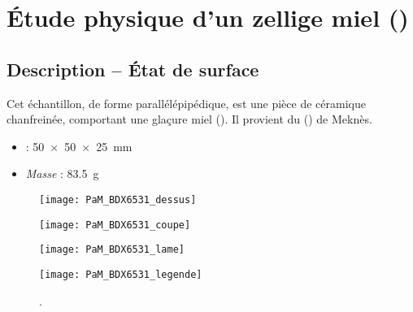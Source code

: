 
\chapter{Étude physique d'un zellige miel ()}

\section{Description -- État de surface}

Cet échantillon, de forme parallélépipédique, est une 
pièce de céramique chanfreinée, comportant une glaçure miel 
(). Il provient du \PaM () de Meknès.

\begin{itemize}
  \item \DimText : \SI{50x50x25}{\mm}
  \item \emph{Masse} : \SI{83.5}{\g}
\end{itemize}


\begin{figure}[htb]
  \begin{minipage}[b]{3.9cm}
    \centerfloat
    \vspace*{0pt}
    \texttt{[image: PaM\_BDX6531\_dessus]}

    \bigskip

    \texttt{[image: PaM\_BDX6531\_coupe]}
  \end{minipage}%
  \qquad%
  \begin{minipage}[b]{4.1cm}
    \centerfloat
    \vspace*{0pt}
    \texttt{[image: PaM\_BDX6531\_lame]}
  \end{minipage}
  \qquad%
  \begin{minipage}[b]{3.2cm}
    \vspace*{0pt}

    \texttt{[image: PaM\_BDX6531\_legende]}

    \bigskip
  \end{minipage}
  \caption[]{\legendeD.}
  \label{dessin:6531}
\end{figure}


